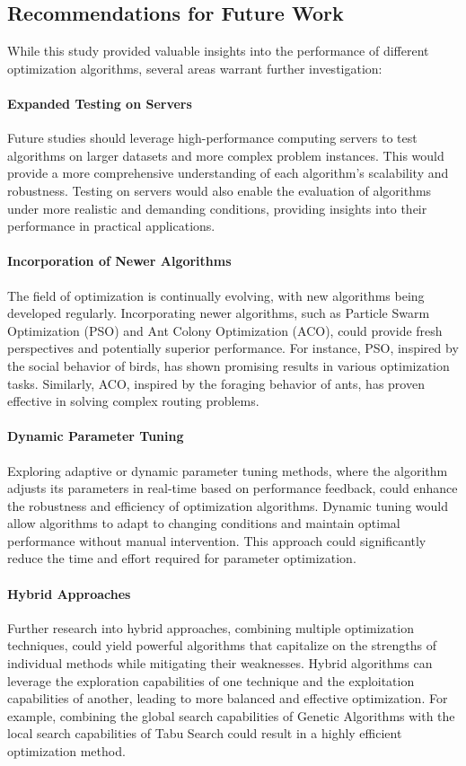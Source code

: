 \documentclass{article}
\begin{document}
    \subsection{Recommendations for Future Work}
    While this study provided valuable insights into the performance of different optimization algorithms, several areas warrant further investigation:

    \paragraph{Expanded Testing on Servers}
    Future studies should leverage high-performance computing servers to test algorithms on larger datasets and more complex problem instances. This would provide a more comprehensive understanding of each algorithm's scalability and robustness. Testing on servers would also enable the evaluation of algorithms under more realistic and demanding conditions, providing insights into their performance in practical applications.

    \paragraph{Incorporation of Newer Algorithms}
    The field of optimization is continually evolving, with new algorithms being developed regularly. Incorporating newer algorithms, such as Particle Swarm Optimization (PSO) and Ant Colony Optimization (ACO), could provide fresh perspectives and potentially superior performance. For instance, PSO, inspired by the social behavior of birds, has shown promising results in various optimization tasks. Similarly, ACO, inspired by the foraging behavior of ants, has proven effective in solving complex routing problems.

    \paragraph{Dynamic Parameter Tuning}
    Exploring adaptive or dynamic parameter tuning methods, where the algorithm adjusts its parameters in real-time based on performance feedback, could enhance the robustness and efficiency of optimization algorithms. Dynamic tuning would allow algorithms to adapt to changing conditions and maintain optimal performance without manual intervention. This approach could significantly reduce the time and effort required for parameter optimization.

    \paragraph{Hybrid Approaches}
    Further research into hybrid approaches, combining multiple optimization techniques, could yield powerful algorithms that capitalize on the strengths of individual methods while mitigating their weaknesses. Hybrid algorithms can leverage the exploration capabilities of one technique and the exploitation capabilities of another, leading to more balanced and effective optimization. For example, combining the global search capabilities of Genetic Algorithms with the local search capabilities of Tabu Search could result in a highly efficient optimization method.
\end{document}

